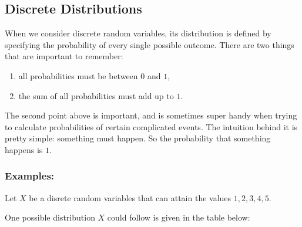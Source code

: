 \documentclass[]{book}
\providecommand{\tightlist}{%
  \setlength{\itemsep}{0pt}\setlength{\parskip}{0pt}}
\theoremstyle{definition}
\theoremstyle{definition}
\theoremstyle{definition}
\theoremstyle{remark}
\begin{document}
\hypertarget{discrete-distributions}{%
\subsection{Discrete Distributions}\label{discrete-distributions}}

When we consider discrete random variables, its distribution is defined by specifying the probability of every single possible outcome. There are two things that are important to remember:

\begin{enumerate}
\def\labelenumi{\arabic{enumi}.}
\tightlist
\item
  all probabilities must be between \(0\) and \(1\),
\item
  the sum of all probabilities must add up to \(1\).
\end{enumerate}

The second point above is important, and is sometimes super handy when trying to calculate probabilities of certain complicated events. The intuition behind it is pretty simple: something must happen. So the probability that something happens is \(1\).

\hypertarget{examples-4}{%
\subsubsection{Examples:}\label{examples-4}}

Let \(X\) be a disrete random variables that can attain the values \(1,2,3,4,5\).

One possible distribution \(X\) could follow is given in the table below:
\end{document}
